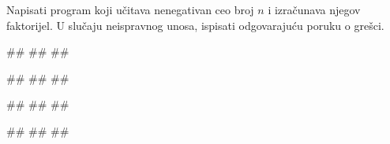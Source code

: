 \begin{Exercise}[label=PET_05] 
 Napisati program koji učitava nenegativan ceo broj $n$ i izračunava njegov
 faktorijel. 
 U slučaju neispravnog unosa, ispisati odgovarajuću poruku o grešci. 


\begin{miditest}
\begin{upotreba}{1}
#\naslovInt#
##
##
\end{upotreba}
\end{miditest}
\begin{miditest}
\begin{upotreba}{2}
#\naslovInt#
##
##
\end{upotreba}
\end{miditest}

\begin{miditest}
\begin{upotreba}{3}
#\naslovInt#
##
##
\end{upotreba}
\end{miditest}
\begin{miditest}
\begin{upotreba}{4}
#\naslovInt#
##
##
\end{upotreba}
\end{miditest}

\end{Exercise}
\ifresenja
\begin{Answer}[ref=PET_05]
\sstrana
\end{Answer}
\fi


